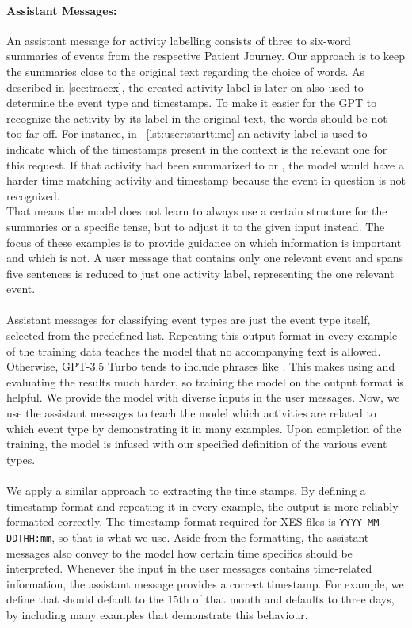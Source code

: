 \paragraph{Assistant Messages:} An assistant message for activity labelling consists of three to six-word summaries of events from the respective Patient Journey. Our approach is to keep the summaries close to the original text regarding the choice of words. As described in \autoref{sec:tracex}, the created activity label is later on also used to determine the event type and timestamps. To make it easier for the GPT to recognize the activity by its label in the original text, the words should be not too far off. For instance, in ~\autoref{lst:user:starttime} an activity label is used to indicate which of the timestamps present in the context is the relevant one for this request. If that activity had been summarized to  or , the model would have a harder time matching activity and timestamp because the event in question is not recognized.\\
That means the model does not learn to always use a certain structure for the summaries or a specific tense, but to adjust it to the given input instead. The focus of these examples is to provide guidance on which information is important and which is not. A user message that contains only one relevant event and spans five sentences is reduced to just one activity label, representing the one relevant event.\\\\
Assistant messages for classifying event types are just the event type itself, selected from the predefined list. Repeating this output format in every example of the training data teaches the model that no accompanying text is allowed. Otherwise, GPT-3.5 Turbo tends to include phrases like . This makes using and evaluating the results much harder, so training the model on the output format is helpful. We provide the model with diverse inputs in the user messages. Now, we use the assistant messages to teach the model which activities are related to which event type by demonstrating it in many examples. Upon completion of the training, the model is infused with our specified definition of the various event types. \\\\
We apply a similar approach to extracting the time stamps. By defining a timestamp format and repeating it in every example, the output is more reliably formatted correctly. The timestamp format required for XES files is \verb|YYYY-MM-DDTHH:mm|, so that is what we use. Aside from the formatting, the assistant messages also convey to the model how certain time specifics should be interpreted. Whenever the input in the user messages contains time-related information, the assistant message provides a correct timestamp. For example, we define that  should default to the 15th of that month and  defaults to three days, by including many examples that demonstrate this behaviour. \\
